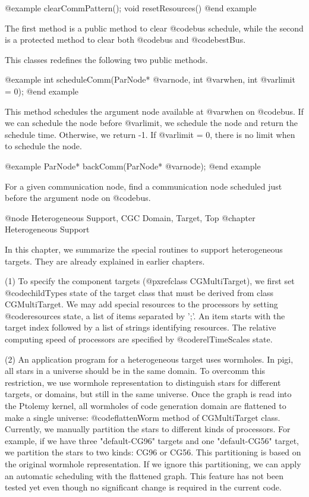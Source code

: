 @example
clearCommPattern();
void resetResources()
@end example

The first method is a public method to clear @code{bus} schedule, while the
second is a protected method to clear both @code{bus} and @code{bestBus}.

This classes redefines the following two public methods.

@example
int scheduleComm(ParNode* @var{node}, int @var{when}, int @var{limit} = 0);
@end example

This method schedules the argument node available at @var{when} on @code{bus}.
If we can schedule the node before @var{limit}, we schedule the node and
return the schedule time. Otherwise, we return -1. If @var{limit} = 0,
there is no limit when to schedule the node.

@example
ParNode* backComm(ParNode* @var{node});
@end example

For a given communication node, find a communication node scheduled just
before the argument node on @code{bus}.

@node Heterogeneous Support, CGC Domain, Target, Top
@chapter Heterogeneous Support

In this chapter, we summarize the special routines to support
heterogeneous targets. They are already explained in earlier chapters.

(1) To specify the component targets (@pxref{class CGMultiTarget}), 
we first set @code{childTypes} state of
the target class that must be derived from class CGMultiTarget.
We may add special resources to the processors by setting @code{resources}
state, a list of items separated by ';'. An item starts with the target index
followed by a list of strings identifying resources. The relative computing
speed of processors are specified by @code{relTimeScales} state.

(2) An application program for a heterogeneous target uses wormholes. In
pigi, all stars in a universe should be in the same domain. To overcomm this
restriction, we use wormhole representation to distinguish stars for
different targets, or domains, but still in the same universe.
Once the graph is read into the Ptolemy kernel, all wormholes of code
generation domain are flattened to make a single universe:
@code{flattenWorm} method of CGMultiTarget class. Currently, we
manually partition the stars to different kinds of processors. For
example, if we have three "default-CG96" targets and one "default-CG56"
target, we partition the stars to two kinds: CG96 or CG56. This
partitioning is based on the original wormhole representation. 
If we ignore this partitioning, we can apply an automatic scheduling with
the flattened graph. This feature has not been tested yet even though
no significant change is required in the current code. 

